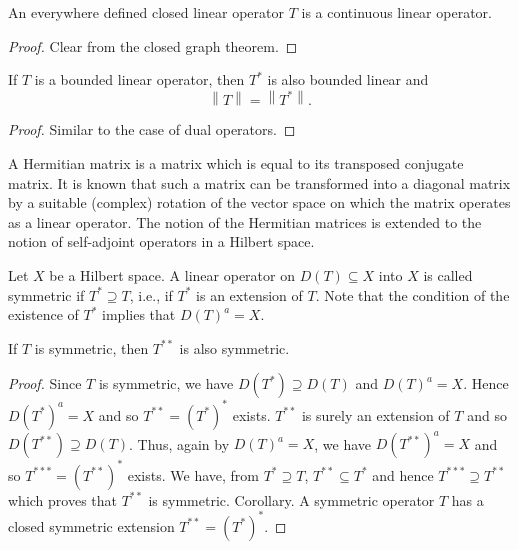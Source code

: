 \begin{theorem}\label{thm:VII.2.Theorem.4} An everywhere defined closed linear operator $T$ is a continuous linear operator. 
\end{theorem}

\begin{proof}
 Clear from the closed graph theorem. 
\end{proof}

\begin{theorem}\label{thm:VII.2.Theorem.5} If $T$ is a bounded linear operator, then $T^*$ is also bounded linear and 
\begin{equation}\label{eq:VII.2.4}
\left\| T \right\| = \left\| T ^{*} \right\|.
\end{equation}
\end{theorem}

\begin{proof}
 Similar to the case of dual operators. 
\end{proof}


\label{sec:VII.3}

A Hermitian matrix is a matrix which is equal to its transposed conjugate matrix. It is known that such a matrix can be transformed into a diagonal matrix by a suitable (complex) rotation of the vector space on which the matrix operates as a linear operator. The notion of the Hermitian matrices is extended to the notion of self-adjoint operators in a Hilbert space. 

\begin{definition}\label{def:VII.3.Definition.1} Let $X$ be a Hilbert space. A linear operator on $D(T) \subseteq X$ into $X$ is called symmetric if $T^* \supseteq T$, i.e., if $T^*$ is an extension of $T$. Note that the condition of the existence of $T^*$ implies that $D(T)^a = X$. 
\end{definition}

\begin{proposition}\label{prop:VII.3.Proposition.1} If $T$ is symmetric, then $T^{**}$ is also symmetric. 
\end{proposition}

\begin{proof}
 Since $T$ is symmetric, we have $D(T^{*}) \supseteq D(T)$ and $D(T)^{a} = X$. Hence $D(T^{*})^{a} = X$ and so $T^{**} = (T^{*})^{*}$ exists. $T^{**}$ is surely an extension of $T$ and so $D(T^{**}) \supseteq D(T)$. Thus, again by $D(T)^{a} = X$, we have $D(T^{**})^{a} = X$ and so $T^{***} = (T^{**})^{*}$ exists. We have, from $T^{*} \supseteq T$, $T^{**} \subseteq T^{*}$ and hence $T^{***} \supseteq T^{**}$ which proves that $T^{**}$ is symmetric. Corollary. A symmetric operator $T$ has a closed symmetric extension $T^{**} = (T^{*})^{*}$. 
\end{proof}

